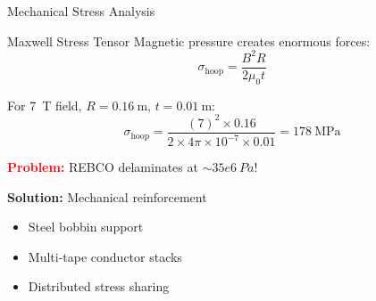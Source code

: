 \documentclass[aspectratio=169,xcolor={table,dvipsnames}]{beamer}
\newcommand{\Tesla}[1]{#1~T}
\newcommand{\Pascal}[1]{#1~Pa}
\newcommand{\highlight}[1]{\textcolor{red}{\textbf{#1}}}
\begin{document}
\begin{frame}{Mechanical Stress Analysis}
    \begin{block}{Maxwell Stress Tensor}
        Magnetic pressure creates enormous forces:
        \begin{equation}
            \sigma_{\text{hoop}} = \frac{B^2 R}{2 \mu_0 t}
        \end{equation}
        
        For \Tesla{7} field, $R = 0.16~\text{m}$, $t = 0.01~\text{m}$:
        \begin{equation}
            \sigma_{\text{hoop}} = \frac{(7)^2 \times 0.16}{2 \times 4\pi \times 10^{-7} \times 0.01} = 178~\text{MPa}
        \end{equation}
    \end{block}
    
    \vspace{0.3cm}
    \highlight{Problem:} REBCO delaminates at $\sim\Pascal{35e6}$!
    
    \textbf{Solution:} Mechanical reinforcement
    \begin{itemize}
        \item Steel bobbin support
        \item Multi-tape conductor stacks
        \item Distributed stress sharing
    \end{itemize}
\end{frame}
\end{document}
